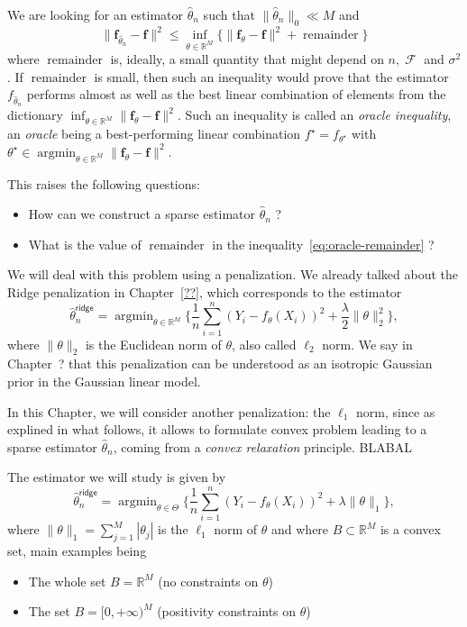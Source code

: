 \documentclass[
	fontsize=11pt, %
	twoside=false, %
	numbers=noenddot, %
]{kaobook}
\DeclareMathOperator{\cF}{{\mathcal F}}
\renewcommand{\bf}{{\boldsymbol f}}
\DeclareMathOperator{\remain}{remainder}
\DeclareMathOperator*{\argmin}{argmin}
\newcommand{\R}{\mathbb R}
\newcommand{\wh}{\widehat}
\newcommand{\norm}[1]{\| #1 \|}
\begin{document}
We are looking for an estimator $\wh \theta_n$ such that $\norm{\wh \theta_n}_0 \ll M$ and
\begin{equation}
	\label{eq:oracle-remainder}
	\norm{\bf_{\wh \theta_n} - \bf}^2 \leq \inf_{\theta \in \R^M} \Big\{ 
	\norm{\bf_\theta - \bf}^2 + \remain \Big\}
\end{equation}
where $\remain$ is, ideally, a small quantity that might depend on $n, \cF$ and $\sigma^2$.
If $\remain$ is small, then such an inequality would prove that the estimator $f_{\wh \theta_n}$ performs almost as well as the best linear combination of elements from the dictionary $\inf_{\theta \in \R^M} \norm{\bf_\theta - \bf}^2$.
Such an inequality is called an \emph{oracle inequality}, an \emph{oracle} being a best-performing linear combination $f^\star = f_{\theta^\star}$ with $\theta^\star \in \argmin_{\theta \in \R^M} \norm{\bf_\theta - \bf}^2$. 

This raises the following questions:
\begin{itemize}
	\item How can we construct a sparse estimator $\wh \theta_n$ ?
	\item What is the value of $\remain$ in the inequality~\eqref{eq:oracle-remainder} ?
\end{itemize}
We will deal with this problem using a penalization.
We already talked about the Ridge penalization in Chapter~\ref{??}, which corresponds to the estimator
\begin{equation}
	\label{eq:chap-lasso-ridge-estimator}
	\wh \theta_n^{\mathsf{ridge}} = \argmin_{\theta \in \R^M} 
	\Big\{ \frac 1n \sum_{i=1}^n (Y_i - f_\theta(X_i))^2 + \frac{\lambda}{2} \norm{\theta}_2^2 \Big\},
\end{equation}
where $\norm{\theta}_2$ is the Euclidean norm of $\theta$, also called $\ell_2$ norm.
We say in Chapter~? that this penalization can be understood as an isotropic Gaussian prior in the Gaussian linear model.

In this Chapter, we will consider another penalization: the $\ell_1$ norm, since as explined in what follows, it allows to formulate convex problem leading to a sparse estimator $\wh \theta_n$, coming from a \emph{convex relaxation} principle. BLABAL

The estimator we will study is given by
\begin{equation}
	\label{eq:lasso-def}
		\wh \theta_n^{\mathsf{ridge}} = \argmin_{\theta \in \Theta} 
		\Big\{ \frac 1n \sum_{i=1}^n (Y_i - f_\theta(X_i))^2 + \lambda \norm{\theta}_1 \Big\},
\end{equation}
where $\norm{\theta}_1 = \sum_{j=1}^M |\theta_j|$ is the $\ell_1$ norm of $\theta$ and where $B \subset \R^M$ is a convex set, main examples being
\begin{itemize}
 	\item The whole set $B = \R^M$ (no constraints on $\theta$)
 	\item The set $B = [0, +\infty)^M$ (positivity constraints on $\theta$)
 \end{itemize}
\end{document}
